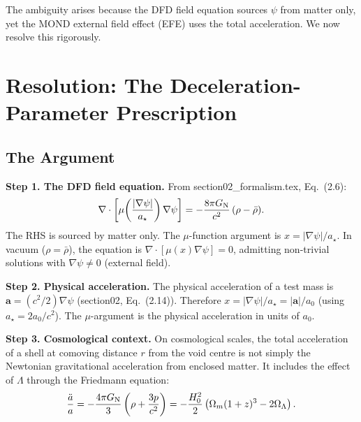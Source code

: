 \documentclass[11pt,a4paper]{article}
\newcounter{findingctr}
\newenvironment{finding}[1][]{%
  \refstepcounter{findingctr}%
  \begin{tcolorbox}[colback=blue!3!white, colframe=blue!50!black,
    title=\textbf{Finding \thefindingctr: #1}]
}{%
  \end{tcolorbox}%
}
\newcommand{\Hzero}{H_0}
\newcommand{\aM}{a_0}
\newcommand{\astar}{a_\star}
\newcommand{\mufd}{\mu}
\newcommand{\GN}{G_{\rm N}}
\newcommand{\Omm}{\Omega_m}
\newcommand{\OmL}{\Omega_\Lambda}
\begin{document}
The ambiguity arises because the DFD field equation sources $\psi$ from
matter only, yet the MOND external field effect (EFE) uses the total
acceleration.  We now resolve this rigorously.


\section{Resolution: The Deceleration-Parameter Prescription}
\label{sec:T4-resolution}

\begin{finding}[\textbf{CRITICAL}: Option (B) Is Uniquely Correct]
\label{find:T4-resolution}

\subsection*{The Argument}

\textbf{Step 1.  The DFD field equation.}  From section02\_formalism.tex,
Eq.~(2.6):
\begin{equation}
\nabla\cdot\left[\mufd\!\left(\frac{|\nabla\psi|}{\astar}\right)
\nabla\psi\right] = -\frac{8\pi\GN}{c^2}\,(\rho - \bar{\rho}).
\label{eq:field-eq}
\end{equation}
The RHS is sourced by matter only.  The $\mufd$-function argument is
$x = |\nabla\psi|/\astar$.  In vacuum ($\rho = \bar{\rho}$), the
equation is $\nabla\cdot[\mufd(x)\nabla\psi] = 0$, admitting non-trivial
solutions with $\nabla\psi \neq 0$ (external field).

\textbf{Step 2.  Physical acceleration.}  The physical acceleration
of a test mass is $\mathbf{a} = (c^2/2)\nabla\psi$ (section02, Eq.~(2.14)).
Therefore $x = |\nabla\psi|/\astar = |\mathbf{a}|/\aM$ (using
$\astar = 2\aM/c^2$).  The $\mufd$-argument is the physical
acceleration in units of $\aM$.

\textbf{Step 3.  Cosmological context.}  On cosmological scales, the
total acceleration of a shell at comoving distance $r$ from the void
centre is not simply the Newtonian gravitational acceleration from
enclosed matter.  It includes the effect of $\Lambda$ through the
Friedmann equation:
\begin{equation}
\frac{\ddot{a}}{a} = -\frac{4\pi\GN}{3}\left(\rho + \frac{3p}{c^2}\right)
= -\frac{\Hzero^2}{2}\left(\Omm(1+z)^3 - 2\OmL\right).
\label{eq:deceleration}
\end{equation}


\end{finding}
\end{document}

